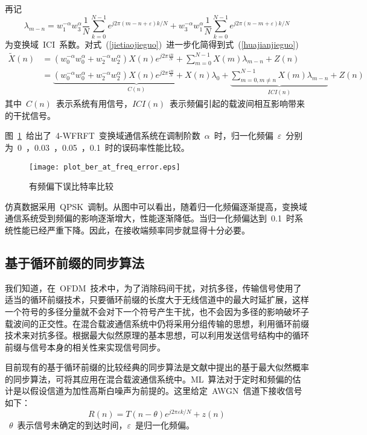 再记
\begin{equation}
{\lambda _{m - n}} = w_1^{ - \alpha }w_3^\alpha \frac{1}{N}\sum\limits_{k = 0}^{N - 1} {{e^{j2\pi (m - n + \varepsilon )k/N}}}  + w_3^{ - \alpha }w_1^\alpha \frac{1}{N}\sum\limits_{k = 0}^{N - 1} {{e^{j2\pi (n - m + \varepsilon )k/N}}}
\end{equation}
为变换域~ICI~系数。对式~(\ref{jietiaojieguo})~进一步化简得到式~(\ref{huajianjieguo})~
\begin{align}\label{huajianjieguo}
\tilde X(n) &= (w_0^{ - \alpha }w_0^\alpha  + w_2^{ - \alpha }w_2^\alpha )X(n){e^{j2\pi \frac{{\varepsilon n}}{N}}} + \sum\limits_{m = 0}^{N - 1} {X(m){\lambda _{m - n}}}  + Z(n) \nonumber \\
&= \underbrace {(w_0^{ - \alpha }w_0^\alpha  + w_2^{ - \alpha }w_2^\alpha )X(n){e^{j2\pi \frac{{\varepsilon n}}{N}}} + X(n){\lambda _0}}_{C(n)} + \underbrace {\sum\limits_{m = 0,m \ne n}^{N - 1} {X(m){\lambda _{m - n}}} }_{ICI(n)} + Z(n)
\end{align}
其中~$C(n)$~表示系统有用信号，$ICI(n)$~表示频偏引起的载波间相互影响带来的干扰信号。

图~\ref{plot_ber_at_freq_error}~给出了~4-WFRFT~变换域通信系统在调制阶数~$\alpha$~时，归一化频偏~$\varepsilon$~分别为~0~，0.03~，0.05~，0.1~时的误码率性能比较。
\begin{figure}[htbp]
\centering
\texttt{[image: plot\_ber\_at\_freq\_error.eps]}
\caption{有频偏下误比特率比较}\vspace{-1em}\label{plot_ber_at_freq_error}
\end{figure}
仿真数据采用~QPSK~调制。从图中可以看出，随着归一化频偏逐渐提高，变换域通信系统受到频偏的影响逐渐增大，性能逐渐降低。当归一化频偏达到~0.1~时系统性能已经严重下降。因此，在接收端频率同步就显得十分必要。


\subsection{基于循环前缀的同步算法}


我们知道，在~OFDM~技术中，为了消除码间干扰，对抗多径，传输信号使用了适当的循环前缀技术，只要循环前缀的长度大于无线信道中的最大时延扩展，这样一个符号的多径分量就不会对下一个符号产生干扰，也不会因为多径的影响破坏子载波间的正交性。在混合载波通信系统中仍将采用分组传输的思想，利用循环前缀技术来对抗多径。根据最大似然原理的基本思想，可以利用发送信号结构中的循环前缀与信号本身的相关性来实现信号同步。

目前现有的基于循环前缀的比较经典的同步算法是文献\cite{Jan1997ML}中提出的基于最大似然概率的同步算法，可将其应用在混合载波通信系统中。ML~算法对于定时和频偏的估计是以假设信道为加性高斯白噪声为前提的。这里给定~AWGN~信道下接收信号如下：
\begin{equation}
R(n) = T(n-\theta){e^{j2\pi \varepsilon k/N} } + z(n)
\end{equation}
~$\theta$~表示信号未确定的到达时间，$\varepsilon$~是归一化频偏。

